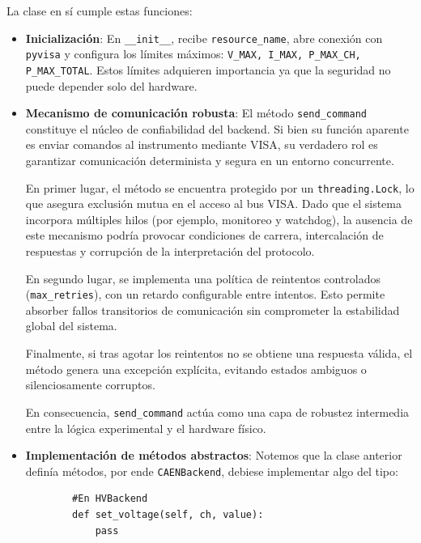 \documentclass{article}
\begin{document}
La clase en sí cumple estas funciones: 

\begin{itemize}
    \item \textbf{Inicialización}: \newline En \texttt{\_\_init\_\_}, recibe \texttt{resource\_name}, abre conexión con \texttt{pyvisa} y configura los límites máximos: \texttt{V\_MAX, I\_MAX, P\_MAX\_CH, P\_MAX\_TOTAL}. Estos límites adquieren importancia ya que la seguridad no puede depender solo del hardware. \\

    \item \textbf{Mecanismo de comunicación robusta}: \newline
    El método \texttt{send\_command} constituye el núcleo de confiabilidad del backend. 
Si bien su función aparente es enviar comandos al instrumento mediante VISA, 
su verdadero rol es garantizar comunicación determinista y segura en un entorno concurrente.

En primer lugar, el método se encuentra protegido por un \texttt{threading.Lock}, 
lo que asegura exclusión mutua en el acceso al bus VISA. 
Dado que el sistema incorpora múltiples hilos (por ejemplo, monitoreo y watchdog), 
la ausencia de este mecanismo podría provocar condiciones de carrera, intercalación de respuestas y corrupción de la interpretación del protocolo.

En segundo lugar, se implementa una política de reintentos controlados 
(\texttt{max\_retries}), con un retardo configurable entre intentos. 
Esto permite absorber fallos transitorios de comunicación sin comprometer la estabilidad global del sistema.

Finalmente, si tras agotar los reintentos no se obtiene una respuesta válida, 
el método genera una excepción explícita, evitando estados ambiguos o silenciosamente corruptos.

En consecuencia, \texttt{send\_command} actúa como una capa de robustez intermedia 
entre la lógica experimental y el hardware físico. 
    

    \item \textbf{Implementación de métodos abstractos}: \newline 
    Notemos que la clase anterior definía métodos, por ende \texttt{CAENBackend}, debiese implementar algo del tipo:
    \begin{lstlisting}
        #En HVBackend
        def set_voltage(self, ch, value):
            pass


\end{lstlisting}
\end{itemize}
\end{document}
